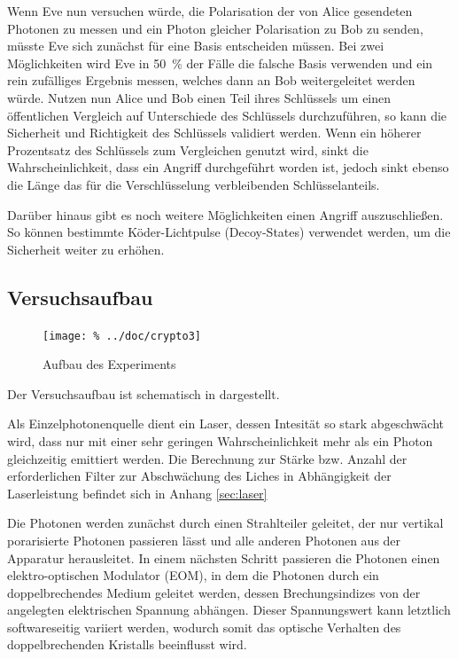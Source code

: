 Wenn Eve nun versuchen würde, die Polarisation der von Alice gesendeten Photonen
zu messen und ein Photon gleicher Polarisation zu Bob zu senden, müsste Eve
sich zunächst für eine Basis entscheiden müssen. Bei zwei Möglichkeiten wird
Eve in \SI{50}{\percent} der Fälle die falsche Basis verwenden und ein rein
zufälliges Ergebnis messen, welches dann an Bob weitergeleitet werden würde.
Nutzen nun Alice und Bob einen Teil ihres Schlüssels um einen öffentlichen
Vergleich auf Unterschiede des Schlüssels durchzuführen, so kann die Sicherheit
und Richtigkeit des Schlüssels validiert werden. Wenn ein höherer Prozentsatz
des Schlüssels zum Vergleichen genutzt wird, sinkt die Wahrscheinlichkeit, dass
ein Angriff durchgeführt worden ist, jedoch sinkt ebenso die Länge das für die
Verschlüsselung verbleibenden Schlüsselanteils.

Darüber hinaus gibt es noch weitere Möglichkeiten einen Angriff auszuschließen.
So können bestimmte Köder-Lichtpulse (Decoy-States) verwendet werden, um die
Sicherheit weiter zu erhöhen.

\subsection{Versuchsaufbau}

\begin{figure}[htb]
 \centering
 \texttt{[image: \%
  ../doc/crypto3]}
 \caption{Aufbau des Experiments}
 \label{fig:aufbau}
\end{figure}

Der Versuchsaufbau ist schematisch in  dargestellt.

Als Einzelphotonenquelle dient ein Laser, dessen Intesität so stark abgeschwächt
wird, dass nur mit einer sehr geringen Wahrscheinlichkeit mehr als ein Photon
gleichzeitig emittiert werden. Die Berechnung zur Stärke bzw. Anzahl der
erforderlichen Filter zur Abschwächung des Liches in Abhängigkeit der
Laserleistung befindet sich in Anhang \ref{sec:laser}


Die Photonen werden zunächst durch einen Strahlteiler geleitet, der nur vertikal
porarisierte Photonen passieren lässt und alle anderen Photonen aus der Apparatur
herausleitet. In einem nächsten Schritt passieren die Photonen einen 
elektro-optischen Modulator (EOM), in dem die Photonen durch ein
doppelbrechendes Medium geleitet werden, dessen Brechungsindizes von der
angelegten elektrischen Spannung abhängen. Dieser Spannungswert kann letztlich
softwareseitig variiert werden, wodurch somit das optische Verhalten des
doppelbrechenden Kristalls beeinflusst wird.

